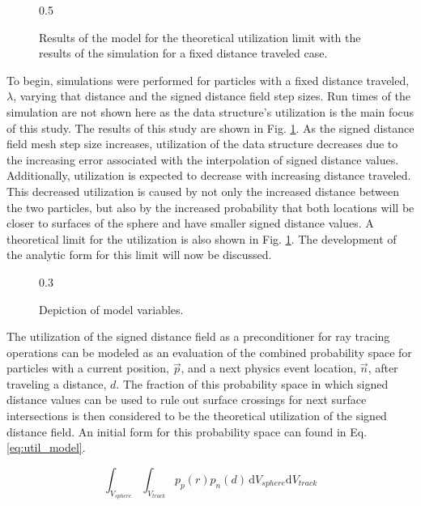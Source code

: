 \begin{figure}[!htb]
  \centering
  {0.5\textwidth}
  \caption{Results of the model for the theoretical utilization limit with the
    results of the simulation for a fixed distance traveled case.}
  \label{fig:sdf_fixed_dist}    
\end{figure}

To begin, simulations were performed for particles with a fixed distance
traveled, $\lambda$, varying that distance and the
signed distance field step sizes. Run times of the simulation are not shown here
as the data structure's utilization is the main focus of this study. The results
of this study are shown in Fig. \ref{fig:sdf_fixed_dist}. As the signed distance
field mesh step size increases, utilization of the data structure decreases due
to the increasing error associated with the interpolation of signed distance
values. Additionally, utilization is expected to decrease with increasing
distance traveled. This decreased utilization is caused by not only the increased
distance between the two particles, but also by the increased probability
that both locations will be closer to surfaces of the sphere and have smaller
signed distance values. A theoretical limit for the utilization is also shown in
Fig. \ref{fig:sdf_fixed_dist}. The development of the analytic form for this limit will now be
discussed.

\begin{figure}[ht]
  \centering
  {0.3\textwidth}
  \caption{Depiction of model variables.}
  \label{fig:model}
\end{figure}

The utilization of the signed distance field as a preconditioner for ray tracing
operations can be modeled as an evaluation of the combined probability space for
particles with a current position, $\vec{p}$, and a next physics event location,
$\vec{n}$, after traveling a distance, $d$. The fraction of this probability
space in which signed distance values can be used to rule out surface crossings
for next surface intersections is then considered to be the theoretical
utilization of the signed distance field. An initial form for this probability
space can found in Eq. \ref{eq:util_model}.

\begin{equation}
  \label{eq:util_model}
\int_{V_{sphere}}\int_{V_{track}} p_p(r) p_n(d) \, \mathrm{d}V_{sphere}\mathrm{d}V_{track}
\end{equation}

